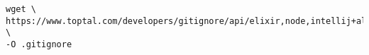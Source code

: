 \lstset{language=bash}
\begin{lstlisting}[frame=htrbl, caption={.gitignore}, label={lst:projekt_setup_gitignore}]
wget \
https://www.toptal.com/developers/gitignore/api/elixir,node,intellij+all,linux,erlang \
-O .gitignore
\end{lstlisting}